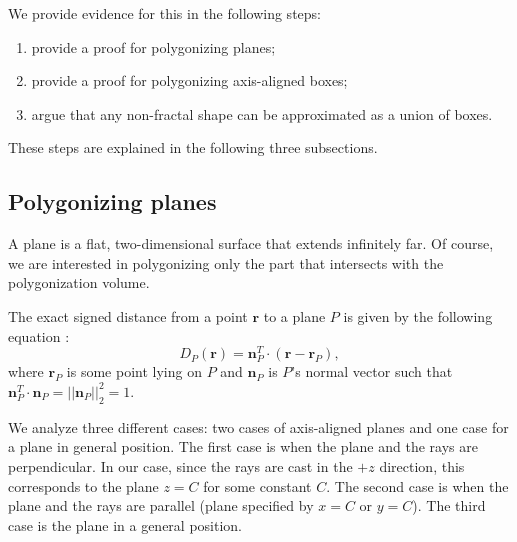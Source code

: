 \documentclass[11pt,twocolumn]{article}
\begin{document}
		We provide evidence for this in the following steps:
		\begin{enumerate}
			\item
				provide a proof for polygonizing planes;
			\item
				provide a proof for polygonizing axis-aligned boxes;
			\item
				argue that any non-fractal shape can be approximated as a union of boxes.
		\end{enumerate}
		These steps are explained in the following three subsections.

		\subsection{Polygonizing planes}
			A plane is a flat, two-dimensional surface that extends infinitely far.
			Of course, we are interested in polygonizing only the part that intersects with the polygonization volume.

			The exact signed distance from a point $\mathbf{r}$ to a plane $P$ is given by the following equation \cite{ppdist}:
			\begin{equation}\label{eq:plane}
				D_P(\mathbf{r})=
				\mathbf{n}_P^T\cdot (\mathbf{r} - \mathbf{r}_P)
				,
			\end{equation}
			where $\mathbf{r}_P$ is some point lying on $P$ and $\mathbf{n}_P$ is $P$'s normal vector such that $\mathbf{n}_P^T\cdot\mathbf{n}_P=||\mathbf{n}_P||_2^2=1$.

			We analyze three different cases: two cases of axis-aligned planes and one case for a plane in general position.
			The first case is when the plane and the rays are perpendicular.
			In our case, since the rays are cast in the $+z$ direction, this corresponds to the plane $z=C$ for some constant $C$.
			The second case is when the plane and the rays are parallel (plane specified by $x=C$ or $y=C$).
			The third case is the plane in a general position.
\end{document}
